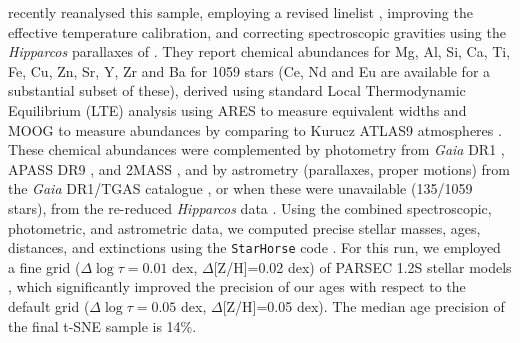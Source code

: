 \documentclass{aa}  %
\begin{document}
\citet{DelgadoMena2017} recently reanalysed this sample, employing a revised linelist \citep{Tsantaki2013}, improving the effective temperature calibration, and correcting spectroscopic gravities using the {\it Hipparcos} parallaxes of \citet{vanLeeuwen2007}. They report chemical abundances for Mg, Al, Si, Ca, Ti, Fe, Cu, Zn, Sr, Y, Zr and Ba for 1059 stars (Ce, Nd and Eu are available for a substantial subset of these), derived using standard Local Thermodynamic Equilibrium (LTE) analysis using ARES \citep{Sousa2007, Sousa2015} to measure equivalent widths and MOOG \citep{Sneden1973} to measure abundances by comparing to Kurucz ATLAS9 atmospheres \citep{Kurucz1993}. These chemical abundances were complemented by photometry from {\it Gaia} DR1 \citep{GaiaCollaboration2016}, APASS DR9 \citep{Henden2014}, and 2MASS \citep{Cutri2003}, and by astrometry (parallaxes, proper motions) from the {\it Gaia} DR1/TGAS catalogue \citep{Michalik2015, GaiaCollaboration2016}, or when these were unavailable (135/1059 stars), from the re-reduced {\it Hipparcos} data \citep{vanLeeuwen2007}. Using the combined spectroscopic, photometric, and astrometric data, we computed precise stellar masses, ages, distances, and extinctions using the {\tt StarHorse} code \citep{Queiroz2018}. For this run, we employed a fine grid ($\Delta \log\tau=0.01$ dex, $\Delta$[Z/H]=0.02 dex) of PARSEC 1.2S stellar models \citep{Bressan2012, Tang2014, Chen2015}, which significantly improved the precision of our ages with respect to the default grid ($\Delta \log\tau=0.05$ dex, $\Delta$[Z/H]=0.05 dex). The median age precision of the final t-SNE sample is 14\%.
\end{document}
